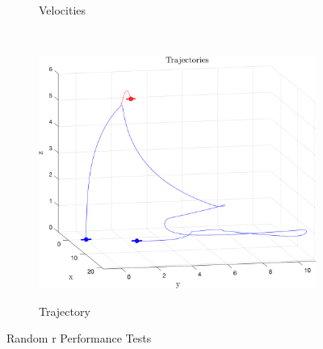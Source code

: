 \documentclass{article}
\begin{document}
\begin{multicols}{2}
\begin{figure}[H]
\begin{subfigure}[b]{0.49\columnwidth}
     \vspace{-5mm}
      \caption{Velocities}
 \end{subfigure}\\
 \bigskip
\begin{subfigure}[b]{1.0\columnwidth}
    \centering
    \includegraphics[width = 1\textwidth]{images/InterceptRandom.png}
     \label{fig:RandTraj}
     \vspace{-5mm}
     \caption{Trajectory}
 \end{subfigure}
    \caption{Random r Performance Tests}
     \label{fig:Randr}
\end{figure}


\end{multicols}
\end{document}
